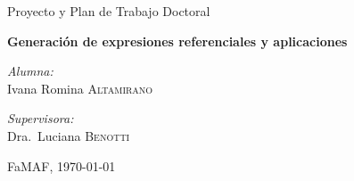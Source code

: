 \documentclass[a4paper,12pt]{article}
\begin{document}
\renewcommand{\refname}{Bibliograf\'ia}

\begin{center}


\vspace{5cm}
{\Large Proyecto y Plan de Trabajo Doctoral}\\[0.5cm]

\vspace{2cm}

{ \Large \bfseries Generaci\'on de expresiones referenciales y aplicaciones} \\ 

\vspace{0.5cm}


\begin{minipage}{0.4\textwidth}
\begin{flushleft} \large
\emph{Alumna:}\\
Ivana Romina \textsc{Altamirano}
\end{flushleft}
\end{minipage}
\begin{minipage}{0.4\textwidth}
\begin{flushright} \large
\emph{Supervisora:} \\
Dra.~Luciana \textsc{Benotti}
\end{flushright}
\end{minipage}

\vspace{2cm}

{\large FaMAF, \today}

\end{center}







%




\end{document}
